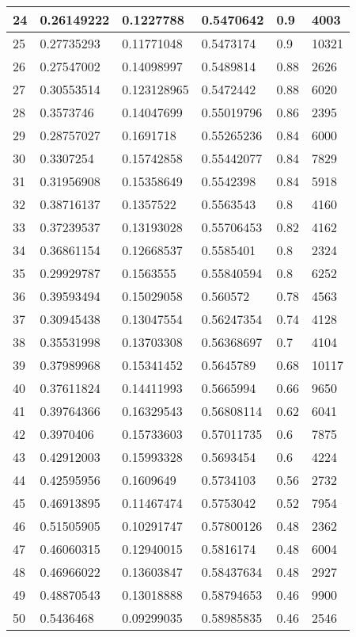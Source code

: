 \begin{longtable}{|l|l|l|l|l|l|}
24 & 0.26149222 & 0.1227788 & 0.5470642 & 0.9 & 4003 \\ \hline 
25 & 0.27735293 & 0.11771048 & 0.5473174 & 0.9 & 10321 \\ \hline 
26 & 0.27547002 & 0.14098997 & 0.5489814 & 0.88 & 2626 \\ \hline 
27 & 0.30553514 & 0.123128965 & 0.5472442 & 0.88 & 6020 \\ \hline 
28 & 0.3573746 & 0.14047699 & 0.55019796 & 0.86 & 2395 \\ \hline 
29 & 0.28757027 & 0.1691718 & 0.55265236 & 0.84 & 6000 \\ \hline 
30 & 0.3307254 & 0.15742858 & 0.55442077 & 0.84 & 7829 \\ \hline 
31 & 0.31956908 & 0.15358649 & 0.5542398 & 0.84 & 5918 \\ \hline 
32 & 0.38716137 & 0.1357522 & 0.5563543 & 0.8 & 4160 \\ \hline 
33 & 0.37239537 & 0.13193028 & 0.55706453 & 0.82 & 4162 \\ \hline 
34 & 0.36861154 & 0.12668537 & 0.5585401 & 0.8 & 2324 \\ \hline 
35 & 0.29929787 & 0.1563555 & 0.55840594 & 0.8 & 6252 \\ \hline 
36 & 0.39593494 & 0.15029058 & 0.560572 & 0.78 & 4563 \\ \hline 
37 & 0.30945438 & 0.13047554 & 0.56247354 & 0.74 & 4128 \\ \hline 
38 & 0.35531998 & 0.13703308 & 0.56368697 & 0.7 & 4104 \\ \hline 
39 & 0.37989968 & 0.15341452 & 0.5645789 & 0.68 & 10117 \\ \hline 
40 & 0.37611824 & 0.14411993 & 0.5665994 & 0.66 & 9650 \\ \hline 
41 & 0.39764366 & 0.16329543 & 0.56808114 & 0.62 & 6041 \\ \hline 
42 & 0.3970406 & 0.15733603 & 0.57011735 & 0.6 & 7875 \\ \hline 
43 & 0.42912003 & 0.15993328 & 0.5693454 & 0.6 & 4224 \\ \hline 
44 & 0.42595956 & 0.1609649 & 0.5734103 & 0.56 & 2732 \\ \hline 
45 & 0.46913895 & 0.11467474 & 0.5753042 & 0.52 & 7954 \\ \hline 
46 & 0.51505905 & 0.10291747 & 0.57800126 & 0.48 & 2362 \\ \hline 
47 & 0.46060315 & 0.12940015 & 0.5816174 & 0.48 & 6004 \\ \hline 
48 & 0.46966022 & 0.13603847 & 0.58437634 & 0.48 & 2927 \\ \hline 
49 & 0.48870543 & 0.13018888 & 0.58794653 & 0.46 & 9900 \\ \hline 
50 & 0.5436468 & 0.09299035 & 0.58985835 & 0.46 & 2546 \\ \hline 
\end{longtable}